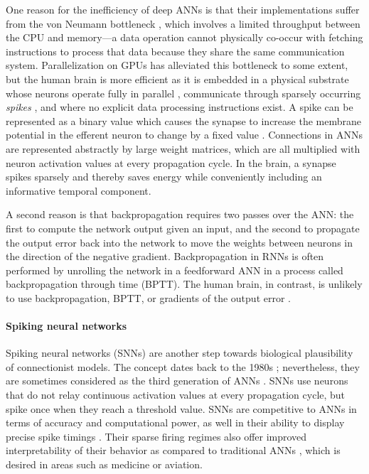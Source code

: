 One reason for the inefficiency of deep ANNs is that their implementations suffer from the von Neumann bottleneck \citep{zenke2021brain}, which involves a limited throughput between the CPU and memory---a data operation cannot physically co-occur with fetching instructions to process that data because they share the same communication system.
Parallelization on GPUs has alleviated this bottleneck to some extent, but the human brain is more efficient as it is embedded in a physical substrate whose neurons operate fully in parallel \citep{a2017parallel}, communicate through sparsely occurring \emph{spikes} \citep{bear2020neuroscience}, and where no explicit data processing instructions exist.
A spike can be represented as a binary value which causes the synapse to increase the membrane potential in the efferent neuron to change by a fixed value \citep{bear2020neuroscience}.
Connections in ANNs are represented abstractly by large weight matrices, which are all multiplied with neuron activation values at every propagation cycle.
In the brain, a synapse spikes sparsely and thereby saves energy while conveniently including an informative temporal component.

A second reason is that backpropagation requires two passes over the ANN: the first to compute the network output given an input, and the second to propagate the output error back into the network to move the weights between neurons in the direction of the negative gradient.
Backpropagation in RNNs is often performed by unrolling the network in a feedforward ANN in a process called backpropagation through time (BPTT).
The human brain, in contrast, is unlikely to use backpropagation, BPTT, or gradients of the output error \citep{lillicrap2019backpropagation}.

\paragraph{Spiking neural networks}
Spiking neural networks (SNNs) \citep{maass1997networks,gerstner2002spiking} are another step towards biological plausibility of connectionist models.
The concept dates back to the 1980s \citep{hopfield1982neural}; nevertheless, they are sometimes considered as the third generation of ANNs \citep{maass1997networks}.
SNNs use neurons that do not relay continuous activation values at every propagation cycle, but spike once when they reach a threshold value.
SNNs are competitive to ANNs in terms of accuracy and computational power, as well in their ability to display precise spike timings \citep{lobo2020spiking}.
Their sparse firing regimes also offer improved interpretability of their behavior as compared to traditional ANNs \citep{soltic2010knowledge}, which is desired in areas such as medicine or aviation.

